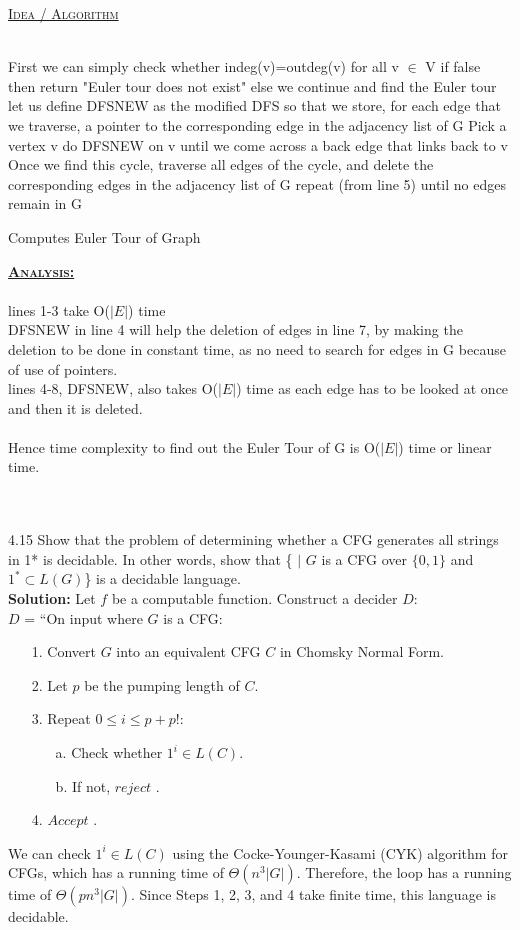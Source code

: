 \documentclass[a4 paper]{article}
\begin{document}
\newpage
{}
\underline{\textsc{Idea / Algorithm}}\\\\
\begin{algorithm}[H]
\SetAlgoLined
{}
First we can simply check whether indeg(v)=outdeg(v) for all v $\in$ V\; if false then return "Euler tour does not exist"\;
else we continue and find the Euler tour\;
let us define DFSNEW as the modified DFS so that we store, for each edge that we traverse,
a pointer to the corresponding edge in the adjacency list of G\;
Pick a vertex v\;
do DFSNEW on v until we come across a back edge that links back to v\;
Once we find this cycle, traverse all edges of the cycle, and delete the corresponding edges in the adjacency list of G\;
repeat (from line 5) until no edges remain in G\;
\caption{Computes Euler Tour of Graph}
\end{algorithm}
\vspace{4mm}
\textbf{\underline{\textsc{Analysis:}}}\\\\
lines 1-3 take O($|E|$) time\\
DFSNEW in line 4 will help the deletion of edges in line 7, by making the deletion to be done in constant time, as no need to search for edges in G because of use of pointers.\\
lines 4-8, DFSNEW, also takes O($|E|$) time as each edge has to be looked at once and then it is deleted.\\\\
Hence time complexity to find out the Euler Tour of G is O($|E|$) time or linear time.\\
\\
\\
\item[4.15]Show that the problem of determining whether a CFG generates all strings in 1* is decidable. In other words, show that \{ $|$ $G$ is a CFG over $\{0, 1\}$ and $1^* \subset L(G)$\} is a decidable language. 
\\
\textbf{Solution:} Let $f$ be a computable function. Construct a decider $D$:
\\
$D$ = ``On input  where $G$ is a CFG:
\begin{enumerate}
\itemsep0em
\item[1.]Convert $G$ into an equivalent CFG $C$ in Chomsky Normal Form.
\item[2.]Let $p$ be the pumping length of $C$.
\item[3.]Repeat $0 \le i \le p + p!$:
\begin{enumerate}
\item[a.]Check whether $1^i \in L(C)$.
\item[b.]If not, $reject$ .
\end{enumerate}
\item[4.]$Accept$ .
\end{enumerate}
We can check $1^i \in L(C)$ using the Cocke-Younger-Kasami (CYK) algorithm for CFGs, which has a running time of $\Theta(n^3 |G|)$. Therefore, the loop has a running time of $\Theta(pn^3 |G|)$. Since Steps 1, 2, 3, and 4 take finite time, this language is decidable.
\\
\end{document}
